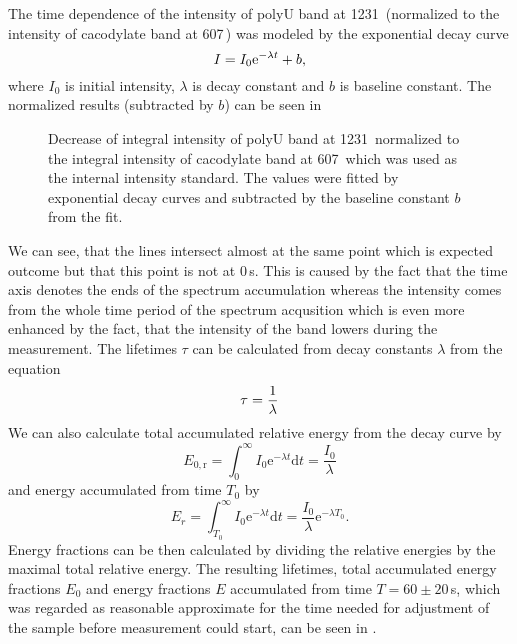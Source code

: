 The time dependence of the intensity of polyU band at 1231\,\icm{} (normalized
to the intensity of cacodylate band at 607\,\icm) was modeled by the
exponential decay curve
\begin{equation}
	I = I_0 \text{e}^{-\lambda t} + b,
	\label{\eqnlabel{power_optim:decay}}
\end{equation}
where $I_0$ is initial intensity, $\lambda$ is decay constant and $b$ is
baseline constant. The normalized results (subtracted by $b$) can be seen in

\begin{figure}
	\centering
	
	\caption{Decrease of integral intensity of polyU band at 1231\,\icm{}
		normalized to the integral intensity of cacodylate band at 607\,\icm{}
		which was used as the internal intensity standard. The values were fitted
		by exponential decay curves  and subtracted
		by the baseline constant $b$ from the fit.}
	\label{\figlabel{power_optim:triplexes}}
\end{figure}

We can see, that the lines intersect almost at the same point which is
expected outcome but that this point is not at 0\,s. This is caused by the fact
that the time axis denotes the ends of the spectrum accumulation whereas the
intensity comes from the whole time period of the spectrum acqusition which
is even more enhanced by the fact, that the intensity of the band lowers
during the measurement. The lifetimes $\tau$ can be calculated from decay
constants $\lambda$ from the equation
\begin{equation}
	\tau = \frac{1}{\lambda}
	\label{\eqnlabel{power_optim:lifetime}}
\end{equation}
We can also calculate total accumulated relative energy from the decay curve
by
\begin{equation*}
	E_{0,\text{r}}
		= \int_0^{\infty}{I_0 \text{e}^{-\lambda t}\text{d}t}
		= \frac{I_0}{\lambda}
\end{equation*}
and energy accumulated from time $T_0$ by
\begin{equation*}
	E_r	= \int_{T_0}^{\infty}{I_0 \text{e}^{-\lambda t}\text{d}t}
		= \frac{I_0}{\lambda} \text{e}^{-\lambda T_0}.
\end{equation*}
Energy fractions can be then calculated by dividing the relative energies by
the maximal total relative energy. The resulting lifetimes, total accumulated
energy fractions $E_0$ and energy fractions $E$ accumulated from time
$T = 60\pm20$\,s, which was regarded as reasonable approximate for the time
needed for adjustment of the sample before measurement could start, can be
seen in
.

